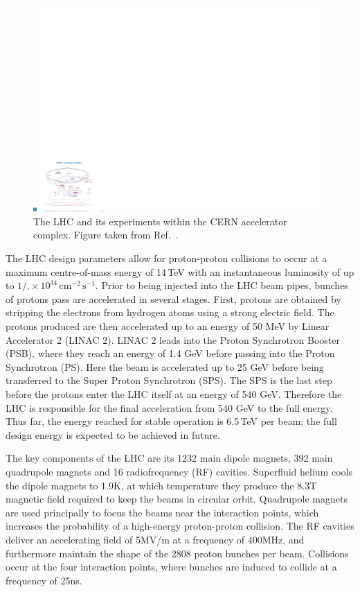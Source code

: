\begin{figure}[h!]
  \centering
  \includegraphics[width=\textwidth]{Figures/Detector/CERNschematic.pdf}
  \caption[The CERN accelerator complex.]
  {The LHC and its experiments within the CERN accelerator complex.
  Figure taken from Ref.~\cite{CERNcomplex}.}
  \label{fig:detector_CERNschematic}
\end{figure}

The LHC design parameters allow for proton-proton collisions to occur at a maximum centre-of-mass energy of 14\,TeV 
with an instantaneous luminosity of up to $1/,\times\,10^{34}\,\textrm{cm}^{-2}\,\textrm{s}^{-1}$.
Prior to being injected into the LHC beam pipes, bunches of protons pass are accelerated in several stages. 
First, protons are obtained by stripping the electrons from hydrogen atoms using a strong electric field.
The protons produced are then accelerated up to an energy of 50 MeV by Linear Accelerator 2 (LINAC 2).
LINAC 2 leads into the Proton Synchrotron Booster (PSB), where they reach an energy of 1.4 GeV before passing into the Proton Synchrotron (PS).
Here the beam is accelerated up to 25 GeV before being transferred to the Super Proton Synchrotron (SPS).
The SPS is the last step before the protons enter the LHC itself at an energy of 540 GeV.
Therefore the LHC is responsible for the final acceleration from 540 GeV to the full energy.
Thus far, the energy reached for stable operation is 6.5\,TeV per beam; the full design energy is expected to be achieved in future.

The key components of the LHC are its 1232 main dipole magnets, 392 main quadrupole magnets and 16 radiofrequency (RF) cavities.
Superfluid helium cools the dipole magnets to 1.9K, at which temperature they produce the 8.3T magnetic field required to keep the beams in circular orbit.
Quadrupole magnets are used principally to focus the beams near the interaction points, which increases the probability of a high-energy proton-proton collision.
The RF cavities deliver an accelerating field of 5MV/m at a frequency of 400MHz, and furthermore maintain the shape of the 2808 proton bunches per beam.
Collisions occur at the four interaction points, where bunches are induced to collide at a frequency of 25ns. 

